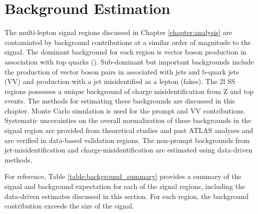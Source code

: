 \chapter[Background Estimation][Background Estimation]{Background Estimation}
\label{chapter:background}

The \tth multi-lepton signal regions discussed in Chapter \ref{chapter:analysis} are contaminted by background contributions at a similar order of magnitude to the signal. The dominant background for each region is vector boson production in association with top quarks (\ttV). Sub-dominant but important backgrounds include the production of vector boson pairs in associated with jets and b-quark jets (VV) and \ttbar production with a jet misidentified as a lepton (fakes). The 2l SS regions possesses a unique background of charge misidentification from Z and top events. The methods for estimating these backgrounds are discussed in this chapter. Monte Carlo simulation is used for the prompt \ttV and VV contributions. Systematic uncerainties on the overall normalization of these backgrounds in the signal region are provided from theoretical studies and past ATLAS analyses and are verified in data-based validation regions. The non-prompt backgrounds from \ttbar jet-misidentification and charge-misidentification are estimated using data-driven methods. 

For reference, Table \ref{table:background_summary} provides a summary of the \tth signal and background expectation for each of the signal regions, including the data-driven estimates discussed in this section. For each region, the background contribution exceeds the size of the signal. 


